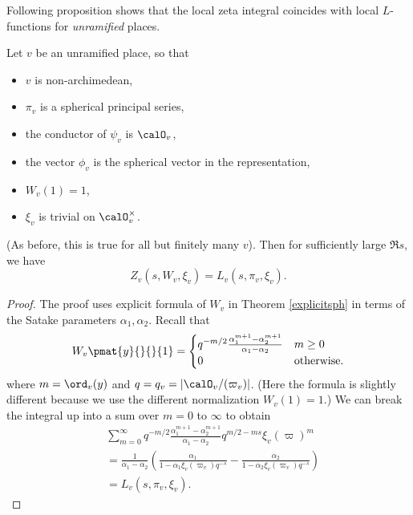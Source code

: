 Following proposition shows that the local zeta integral coincides with local $L$-functions for \emph{unramified} places. 
\begin{proposition}
Let $v$ be an unramified place, so that 
\begin{itemize}
\item $v$ is non-archimedean, 
\item $\pi_{v}$ is a spherical principal series, 
\item the conductor of $\psi_{v}$ is $\calO_{v}$, 
\item the vector $\phi_{v}$ is the spherical vector in the representation, 
\item $W_{v}(1) = 1$, 
\item $\xi_{v}$ is trivial on $\calO_{v}^{\times}$. 
\end{itemize}
(As before, this is true for all but finitely many $v$). Then for sufficiently large $\Re s$, we have $$Z_{v}(s, W_{v}, \xi_{v}) = L_{v}(s, \pi_{v}, \xi_{v}).$$ 
\end{proposition}
\begin{proof}
The proof uses explicit formula of $W_{v}$ in Theorem \ref{explicitsph} in terms of the Satake parameters $\alpha_{1}, \alpha_{2}$. Recall that 
$$
W_{v}\pmat{y}{}{}{1} = \begin{cases} q^{-m/2} \frac{\alpha_{1}^{m+1} - \alpha_{2}^{m+1}}{\alpha_{1} - \alpha_{2}} & m\geq 0 \\ 0 & \text{otherwise.} \end{cases}
$$
where $m = \ord_{v}(y)$ and $q = q_{v} = |\calO_{v}/(\varpi_{v})|$. (Here the formula is slightly different because we use the different normalization $W_{v}(1) = 1$.)
We can break the integral up into a sum over $m=0$ to $\infty$ to obtain
\begin{align*}
&\sum_{m=0}^{\infty} q^{-m/2} \frac{\alpha_{1}^{m+1} - \alpha_{2}^{m+1}}{\alpha_{1} - \alpha_{2}} q^{m/2 - ms}\xi_{v}(\varpi)^{m} \\
&= \frac{1}{\alpha_{1} - \alpha_{2}} \left( \frac{\alpha_{1}}{1-\alpha_{1}\xi_{v}(\varpi_{v})q^{-s}} - \frac{\alpha_{2}}{1-\alpha_{2}\xi_{v}(\varpi_{v})q^{-s}}\right)\\
&= L_{v}(s, \pi_{v}, \xi_{v}).
\end{align*}
\end{proof}


\begin{comment}
\begin{theorem}[Local functional equation]
The local zeta integral $Z_{v}(s, W_{v}, \xi_{v})$ converges for sufficiently large $\Re s$, and has meromorphic continuation to all $s$. 
Also, there exists a meromorphic function $\gamma_{v}(s, \pi_{v}, \xi_{v}, \psi_{v})$ such that 
$$
Z_{v}(1-s, \pi_{v}(w_{1})W_{v}, \xi_{v}^{-1}\omega_{v}^{-1}) = \gamma_{v}(s, \pi_{v},\xi_{v}, \psi_{v}) Z_{v}(s, W_{v}, \xi_{v}). 
$$
\end{theorem}
\begin{proof}
non-archimedean case is proved in the previous chapter (Theorem \ref{localfe}). Archimedean case is proved in Jacquet-Langlands' book, which uses Weil representation. 
\end{proof}
\end{comment}

